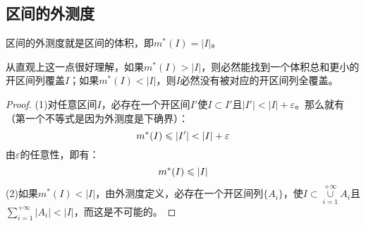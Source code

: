 \subsection{区间的外测度}
\begin{theorem}
	区间的外测度就是区间的体积，即$m^*(I)=|I|$。
\end{theorem}
从直观上这一点很好理解，如果$m^*(I)>|I|$，则必然能找到一个体积总和更小的开区间列覆盖$I$；如果$m^*(I)<|I|$，则$I$必然没有被对应的开区间列全覆盖。
\begin{proof}
	(1)对任意区间$I$，必存在一个开区间$I'$使$I\subset I'$且$|I'|<|I|+\varepsilon$。那么就有（第一个不等式是因为外测度是下确界）：
	\begin{equation}
		m^*(I)\leqslant|I'|<|I|+\varepsilon\notag
	\end{equation}
	由$\varepsilon$的任意性，即有：
	\begin{equation}
		m^*(I)\leqslant|I|\notag
	\end{equation}
	(2)如果$m^*(I)<|I|$，由外测度定义，必存在一个开区间列$\{A_i\}$，使$I\subset\underset{i=1}{\overset{+\infty}{\cup}}A_i$且$\sum\limits_{i=1}^{+\infty}|A_i|<|I|$，而这是不可能的。
\end{proof}












